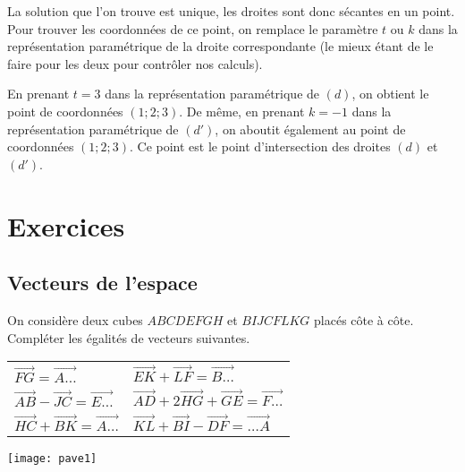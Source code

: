\documentclass[11pt,fleqn, openany]{book} %
\begin{document}
\begin{example}
La solution que l'on trouve est unique, les droites sont donc sécantes en un point. Pour trouver les coordonnées de ce point, on remplace le paramètre $t$ ou $k$ dans la représentation paramétrique de la droite correspondante (le mieux étant de le faire pour les deux pour contrôler nos calculs).

En prenant $t=3$ dans la représentation paramétrique de $(d)$, on obtient le point de coordonnées $(1;2;3)$. De même, en prenant $k=-1$ dans la représentation paramétrique de $(d')$, on aboutit également au point de coordonnées $(1;2;3)$. Ce point est le point d'intersection des droites $(d)$ et $(d')$.
\end{example}

\chapter{Exercices}


\section*{Vecteurs de l'espace}


\begin{exercise}[topic=geo01]\hspace{0pt}

\begin{minipage}{0.5 \linewidth}On considère deux cubes $ABCDEFGH$ et $BIJCFLKG$ placés côte à côte. Compléter les égalités de vecteurs suivantes.
\vskip10pt
\begin{tabularx}{\linewidth}{XX}
 $\overrightarrow{FG} = \overrightarrow{A\ldots}$ & $\overrightarrow{EK}+\overrightarrow{LF}= \overrightarrow{B\ldots}$ \\
 $\overrightarrow{AB}- \overrightarrow{JC} = \overrightarrow{E\ldots}$ &  $\overrightarrow{AD}+2\overrightarrow{HG}+\overrightarrow{GE}=\overrightarrow{F\ldots}$ \\
 $\overrightarrow{HC}+\overrightarrow{BK} = \overrightarrow{A\ldots}$ & $\overrightarrow{KL} + \overrightarrow{BI} - \overrightarrow{DF} = \overrightarrow{\ldots A}$
\end{tabularx}


\end{minipage}\hfill \begin{minipage}{0.4\linewidth}
\texttt{[image: pave1]}

\end{minipage}
\vspace{-0.5cm}\end{exercise}
\end{document}
